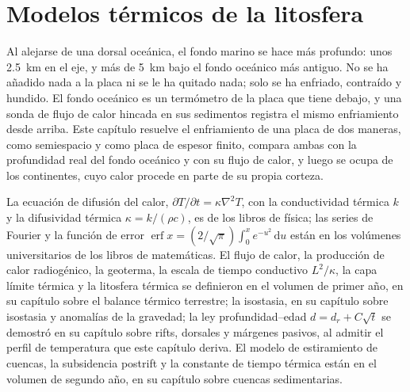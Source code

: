 \chapter{Modelos térmicos de la litosfera}\label{ch:b3:lithosphere-thermal-models}

Al alejarse de una dorsal oceánica, el fondo marino se hace más profundo: unos
\qty{2.5}{km} en el eje, y más de \qty{5}{km} bajo el fondo oceánico más
antiguo. No se ha añadido nada a la placa ni se le ha quitado nada; solo se ha
enfriado, contraído y hundido. El fondo oceánico es un termómetro de la placa
que tiene debajo, y una sonda de flujo de calor hincada en sus sedimentos registra el mismo
enfriamiento desde arriba. Este capítulo resuelve el enfriamiento de una placa de dos maneras,
como semiespacio y como placa de espesor finito, compara ambas con la profundidad
real del fondo oceánico y con su flujo de calor, y luego se ocupa de los continentes,
cuyo calor procede en parte de su propia corteza.

\begin{recall}
La ecuación de difusión del calor, $\partial T/\partial t = \kappa\nabla^2T$,
con la conductividad térmica $k$ y la difusividad térmica $\kappa =
k/(\rho c)$, es de los libros de física; las series de Fourier y la función de error
$\operatorname{erf}x = (2/\sqrt\pi)\int_0^xe^{-u^2}\,\mathrm du$ están en los
volúmenes universitarios de los libros de matemáticas. El flujo de calor, la producción de calor
radiogénico, la geoterma, la escala de tiempo conductivo $L^2/\kappa$, la
capa límite térmica y la litosfera térmica se definieron en el volumen de primer año,
en su capítulo sobre el balance térmico terrestre; la isostasia, en su capítulo sobre
isostasia y anomalías de la gravedad; la ley profundidad--edad $d = d_r + C\sqrt t$ se demostró en
su capítulo sobre rifts, dorsales y márgenes pasivos, al admitir el perfil de temperatura
que este capítulo deriva. El modelo de estiramiento de cuencas, la subsidencia
postrift y la constante de tiempo térmica están en el volumen de segundo año, en su
capítulo sobre cuencas sedimentarias.
\end{recall}

